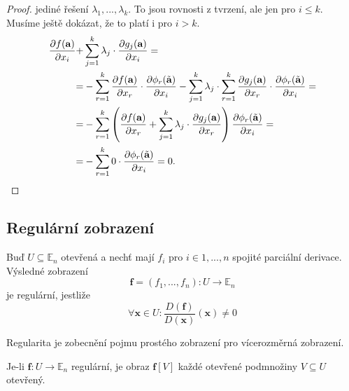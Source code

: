 \documentclass[../main.tex]{subfiles}
\begin{document}
\begin{proof}
	jediné řešení $\lambda_1,...,\lambda_k.$ To jsou rovnosti z tvrzení, ale jen pro $i \leq k$. Musíme ještě dokázat, že to platí i pro $i > k$. 
	\begin{align*}
	\frac{\partial f(\textbf{a})}{\partial x_i} + & \sum^k_{j=1}\lambda_j\cdot\frac{\partial g_j(\textbf{a})}{\partial x_i}=\\
	= & - \sum^k_{r=1} \frac{\partial f(\textbf{a})}{\partial x_r}\cdot\frac{\partial \phi_r(\Tilde{\textbf{a}})}{\partial x_i} -
	\sum^k_{j=1}\lambda_j\cdot\sum^k_{r=1}\frac{\partial g_j(\textbf{a})}{\partial x_r}\cdot\frac{\partial \phi_r(\Tilde{\textbf{a}})}{\partial x_i} =\\
	= & - \sum^k_{r=1}\left(\frac{\partial f(\textbf{a})}{\partial x_r}+\sum^k_{j=1}\lambda_j\cdot\frac{\partial g_j(\textbf{a})}{\partial x_r}\right)\frac{\partial \phi_r(\Tilde{\textbf{a}})}{\partial x_i}=\\
	= & - \sum^k_{r=1}0\cdot\frac{\partial \phi_r(\Tilde{\textbf{a}})}{\partial x_i}=0.
	\end{align*}
\end{proof}

\subsection{Regulární zobrazení}
\begin{definition}
	Buď $U \subseteq \mathbb{E}_n$ otevřená a nechť mají $f_i$ pro $i \in {1, ... , n}$
	spojité parciální derivace. Výsledné zobrazení
	\[ \mathbf{f} = (f_1, ... , f_n): U \to \mathbb{E}_n \]
	je regulární, jestliže
	\[ \forall \mathbf{x} \in U: \frac{D(\mathbf{f})}{D(\mathbf{x})}(\mathbf{x}) \neq 0 \]
\end{definition}

\begin{intuition}
	Regularita je zobecnění pojmu prostého zobrazení pro vícerozměrná zobrazení.
\end{intuition}

\begin{lemma}
	Je-li $\mathbf{f}: U \to \mathbb{E}_n$ regulární, je obraz $\mathbf{f}[V]$ každé otevřené podmnožiny
	$V \subseteq U$ otevřený.
\end{lemma}
\end{document}
